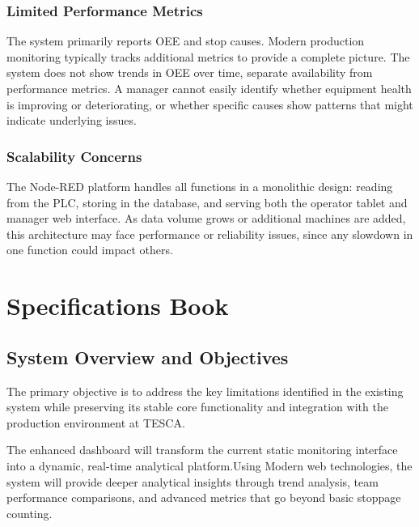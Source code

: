 \subsubsection{\fontsize{13}{16}\selectfont Limited Performance Metrics}

\hspace*{\parindent} The system primarily reports OEE and stop causes. Modern production monitoring typically tracks additional metrics to provide a complete picture. The system does not show trends in OEE over time, separate availability from performance metrics. A manager cannot easily identify whether equipment health is improving or deteriorating, or whether specific causes show patterns that might indicate underlying issues.

\subsubsection{\fontsize{13}{16}\selectfont Scalability Concerns}

\hspace*{\parindent} The Node-RED platform handles all functions in a monolithic design: reading from the PLC, storing in the database, and serving both the operator tablet and manager web interface. As data volume grows or additional machines are added, this architecture may face performance or reliability issues, since any slowdown in one function could impact others.

\section{\fontsize{15}{18}\selectfont Specifications Book}

\subsection{\fontsize{14}{17}\selectfont System Overview and Objectives}

\hspace*{\parindent}  The primary objective is to address the key limitations identified in the existing system while preserving its stable core functionality and integration with the production environment at TESCA.

\hspace*{\parindent} The enhanced dashboard will transform the current static monitoring interface into a dynamic, real-time analytical platform.Using Modern web technologies, the system will provide deeper analytical insights through trend analysis, team performance comparisons, and advanced metrics that go beyond basic stoppage counting.


